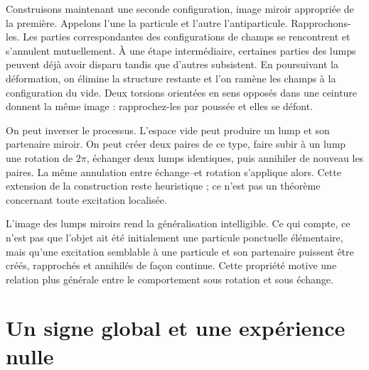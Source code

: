 Construisons maintenant une seconde configuration, image miroir appropriée de la première. Appelons l’une la particule et l’autre l’antiparticule. Rapprochons-les. Les parties correspondantes des configurations de champs se rencontrent et s’annulent mutuellement. À une étape intermédiaire, certaines parties des lumps peuvent déjà avoir disparu tandis que d’autres subsistent. En poursuivant la déformation, on élimine la structure restante et l’on ramène les champs à la configuration du vide. Deux torsions orientées en sens opposés dans une ceinture donnent la même image : rapprochez-les par poussée et elles se défont.

On peut inverser le processus. L’espace vide peut produire un lump et son partenaire miroir. On peut créer deux paires de ce type, faire subir à un lump une rotation de \(2\pi\), échanger deux lumps identiques, puis annihiler de nouveau les paires. La même annulation entre échange--et rotation s’applique alors. Cette extension de la construction reste heuristique ; ce n’est pas un théorème concernant toute excitation localisée.

\begin{classroomqa}
\end{classroomqa}

L’image des lumps miroirs rend la généralisation intelligible. Ce qui compte, ce n’est pas que l’objet ait été initialement une particule ponctuelle élémentaire, mais qu’une excitation semblable à une particule et son partenaire puissent être créés, rapprochés et annihilés de façon continue. Cette propriété motive une relation plus générale entre le comportement sous rotation et sous échange.

\begin{classroomqa}
\end{classroomqa}

\section{Un signe global et une expérience nulle}


